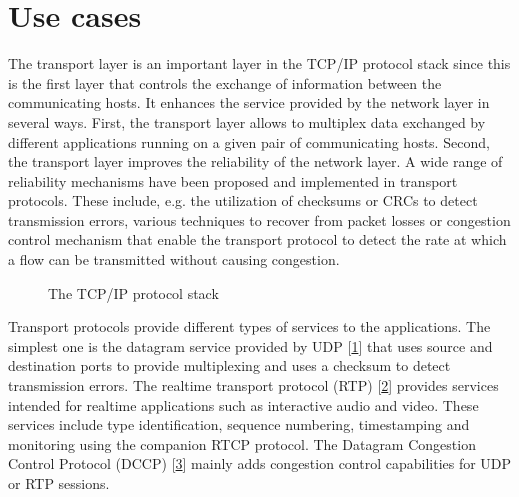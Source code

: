 \documentclass[letterpaper,10pt,english]{sphinxmanual}
\begin{document}
\chapter{Use cases}
\label{\detokenize{usecases:use-cases}}\label{\detokenize{usecases::doc}}
\sphinxAtStartPar
The transport layer is an important layer in the TCP/IP protocol stack since this is the first layer that controls the exchange of information between the communicating hosts. It enhances the service provided by the network layer in several ways. First, the transport layer allows to multiplex data exchanged by different applications running on a given pair of communicating hosts. Second, the transport layer improves the reliability of the network layer. A wide range of reliability mechanisms have been proposed and implemented in transport protocols. These include, e.g. the utilization of checksums or CRCs to detect transmission errors, various techniques to recover from packet losses or congestion control mechanism that enable the transport protocol to detect the rate at which a flow can be transmitted without causing congestion.
\begin{figure}[htbp]\centering\capstart{}\caption{The TCP/IP protocol stack}\label{\detokenize{usecases:id23}}\label{\detokenize{usecases:fig-layers}}\end{figure}
\sphinxAtStartPar
Transport protocols provide different types of services to the applications. The simplest one is the datagram service provided by UDP {[}\hyperlink{cite.biblio:id704}{1}{]} that uses source and destination ports to provide multiplexing and uses a checksum to detect transmission errors.
The real\sphinxhyphen{}time transport protocol (RTP) {[}\hyperlink{cite.biblio:id3471}{2}{]} provides services intended for real\sphinxhyphen{}time applications such as interactive audio and video. These services include type identification, sequence numbering, timestamping and monitoring using the companion RTCP protocol.
The Datagram Congestion Control Protocol (DCCP) {[}\hyperlink{cite.biblio:id4244}{3}{]} mainly adds congestion control capabilities for UDP or RTP sessions.
\end{document}
